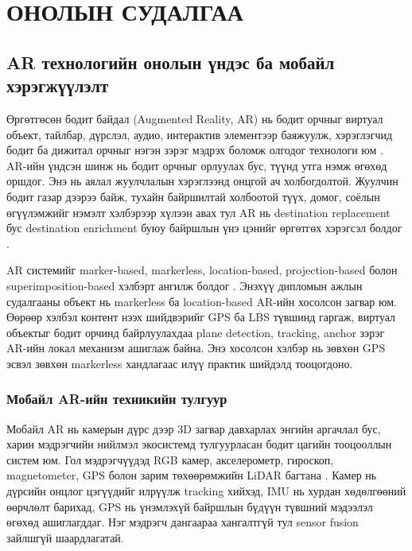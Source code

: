 \chapter{ОНОЛЫН СУДАЛГАА}
\begin{sloppy}

\section{AR технологийн онолын үндэс ба мобайл хэрэгжүүлэлт}

Өргөтгөсөн бодит байдал (Augmented Reality, AR) нь бодит орчныг виртуал объект, тайлбар, дүрслэл, аудио, интерактив элементээр баяжуулж, хэрэглэгчид бодит ба дижитал орчныг нэгэн зэрэг мэдрэх боломж олгодог технологи юм \cite{Azuma1997,Milgram1994}. AR-ийн үндсэн шинж нь бодит орчныг орлуулах бус, түүнд утга нэмж өгөхөд оршдог. Энэ нь аялал жуулчлалын хэрэглээнд онцгой ач холбогдолтой. Жуулчин бодит газар дээрээ байж, тухайн байршилтай холбоотой түүх, домог, соёлын өгүүлэмжийг нэмэлт хэлбэрээр хүлээн авах тул AR нь destination replacement бус destination enrichment буюу байршлын үнэ цэнийг өргөтгөх хэрэгсэл болдог \cite{Kounavis2012TourismAR}.

AR системийг marker-based, markerless, location-based, projection-based болон superimposition-based хэлбэрт ангилж болдог \cite{Billinghurst2015ARSurvey,Brito2017MarkerVsMarkerless}. Энэхүү дипломын ажлын судалгааны объект нь markerless ба location-based AR-ийн хосолсон загвар юм. Өөрөөр хэлбэл контент нээх шийдвэрийг GPS ба LBS түвшинд гаргаж, виртуал объектыг бодит орчинд байрлуулахдаа plane detection, tracking, anchor зэрэг AR-ийн локал механизм ашиглаж байна. Энэ хосолсон хэлбэр нь зөвхөн GPS эсвэл зөвхөн markerless хандлагаас илүү практик шийдэлд тооцогдоно.

\subsection{Мобайл AR-ийн техникийн тулгуур}

Мобайл AR нь камерын дүрс дээр 3D загвар давхарлах энгийн аргачлал бус, харин мэдрэгчийн нийлмэл экосистемд тулгуурласан бодит цагийн тооцооллын систем юм. Гол мэдрэгчүүдэд RGB камер, акселерометр, гироскоп, magnetometer, GPS болон зарим төхөөрөмжийн LiDAR багтана \cite{Haneefa2024,Syed2022ARTracking}. Камер нь дүрсийн онцлог цэгүүдийг илрүүлж tracking хийхэд, IMU нь хурдан хөдөлгөөний өөрчлөлт барихад, GPS нь үнэмлэхүй байршлын бүдүүн түвшний мэдээлэл өгөхөд ашиглагддаг. Нэг мэдрэгч дангаараа хангалтгүй тул sensor fusion зайлшгүй шаардлагатай.


\end{sloppy}
